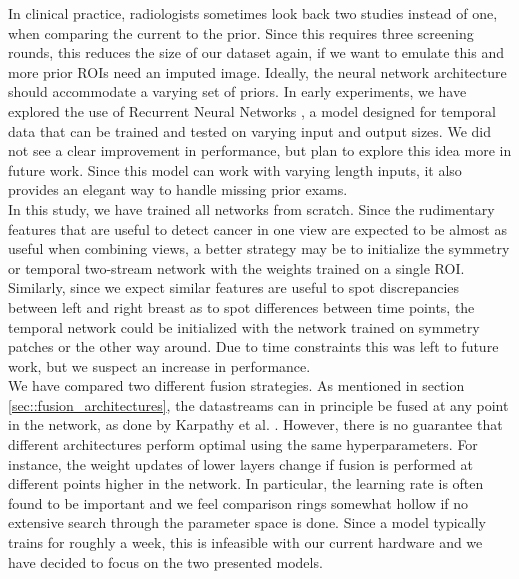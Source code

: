 \documentclass[12pt]{spieman}  %
\begin{document}
In clinical practice, radiologists sometimes look back two studies instead of one, when comparing the current to the prior. Since this requires three screening rounds, this reduces the size of our dataset again, if we want to emulate this and more prior ROIs need an imputed image. Ideally, the neural network architecture should accommodate a varying set of priors. In early experiments, we have explored the use of Recurrent Neural Networks \cite{Grav12, Gref15, Lipt15a}, a model designed for temporal data that can be trained and tested on varying input and output sizes. We did not see a clear improvement in performance, but plan to explore this idea more in future work. Since this model can work with varying length inputs, it also provides an elegant way to handle missing prior exams.\\

In this study, we have trained all networks from scratch. Since the rudimentary features that are useful to detect cancer in one view are expected to be almost as useful when combining views, a better strategy may be to initialize the symmetry or temporal two-stream network with the weights trained on a single ROI. Similarly, since we expect similar features are useful to spot discrepancies between left and right breast as to spot differences between time points, the temporal network could be initialized with the network trained on symmetry patches or the other way around. Due to time constraints this was left to future work, but we suspect an increase in performance. \\

We have compared two different fusion strategies. As mentioned in section \ref{sec::fusion_architectures}, the datastreams can in principle be fused at any point in the network, as done by Karpathy et al. \cite{Karp14}. However, there is no guarantee that different architectures perform optimal using the same hyperparameters. For instance, the weight updates of lower layers change if fusion is performed at different points higher in the network. In particular, the learning rate is often found to be important and we feel comparison rings somewhat hollow if no extensive search through the parameter space is done. Since a model typically trains for roughly a week, this is infeasible with our current hardware and we have decided to focus on the two presented models. \\ 
\end{document}
